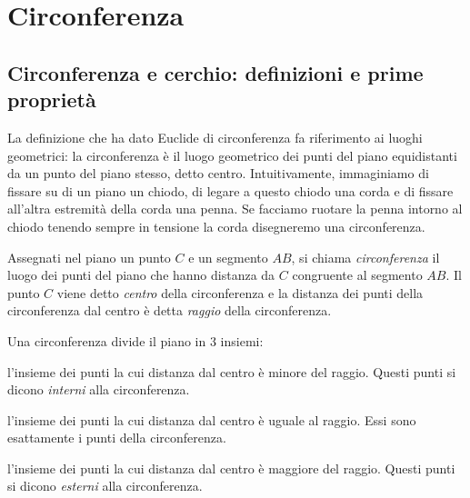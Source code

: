 
\chapter{Circonferenza}\label{chap:circonferenza}



\section{Circonferenza e cerchio: definizioni e prime proprietà}
\label{sect:circonferenza_cerchio_def}

La definizione che ha dato Euclide di circonferenza fa riferimento ai 
luoghi geometrici: la circonferenza è il luogo geometrico dei punti 
del piano equidistanti da un punto del piano stesso, detto centro.
Intuitivamente, immaginiamo di fissare su di un piano un chiodo, di 
legare a questo chiodo una corda e di fissare all'altra estremità 
della corda una penna. Se facciamo ruotare la penna intorno al chiodo 
tenendo sempre in tensione la corda disegneremo una circonferenza.

\begin{definizione}
Assegnati nel piano un punto $C$ e un segmento $AB$, si chiama 
\emph{circonferenza} il luogo dei punti del piano che hanno distanza 
da $C$ congruente al segmento $AB$. Il punto $C$ viene detto 
\emph{centro} della circonferenza e la distanza dei punti della 
circonferenza dal centro è detta \emph{raggio} della circonferenza.
\end{definizione}

\osservazione Una circonferenza divide il piano in 3 insiemi:
\begin{itemize*}
\item l'insieme dei punti la cui distanza dal centro è minore del 
raggio. Questi punti si dicono \emph{interni} alla circonferenza.
\item l'insieme dei punti la cui distanza dal centro è uguale al 
raggio. Essi sono esattamente i punti della circonferenza.
\item l'insieme dei punti la cui distanza dal centro è maggiore del 
raggio. Questi punti si dicono \emph{esterni} alla circonferenza.
\end{itemize*}

